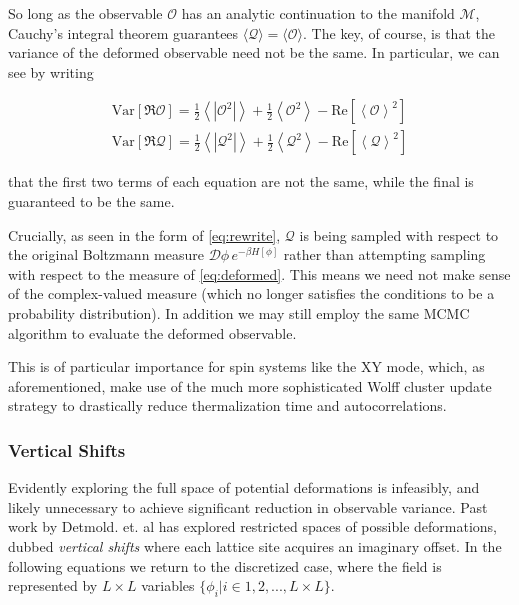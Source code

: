 \documentclass[12pt]{article}
\begin{document}
So long as the observable $\mathcal{O}$ has an analytic continuation to the manifold $\mathcal{M}$, Cauchy's integral theorem guarantees 
$\langle \mathcal{Q} \rangle = \langle \mathcal{O} \rangle$. The key, of course, is that the variance of the deformed observable need not be the
same. In particular, we can see by writing

\begin{equation} \label{eq:variances}
	\begin{split}
	\mathrm{Var}[\Re \mathcal{O}] = \frac{1}{2} \left\langle \left| \mathcal{O}^2 \right| \right\rangle + \frac{1}{2} \left\langle \mathcal{O}^2 \right\rangle 
	- \mathrm{Re}\left[ \left\langle \mathcal{O} \right\rangle^2 \right] \\ 
	\mathrm{Var}[\Re \mathcal{Q}] = \frac{1}{2} \left\langle \left| \mathcal{Q}^2 \right| \right\rangle + \frac{1}{2} \left\langle \mathcal{Q}^2 \right\rangle 
	- \mathrm{Re}\left[ \left\langle \mathcal{Q} \right\rangle^2 \right]
	\end{split}
\end{equation}

that the first two terms of each equation are not the same, while the final is guaranteed to be the same.

Crucially, as seen in the form of \ref{eq:rewrite}, $\mathcal{Q}$ is being sampled with respect to the original Boltzmann measure $\mathcal{D}\phi\, e^{-\beta H[\phi]}$
rather than attempting sampling with respect to the measure of \ref{eq:deformed}. This means we need not make sense of the complex-valued measure (which no
longer satisfies the conditions to be a probability distribution). In addition we may still employ the same MCMC algorithm to evaluate the deformed observable.

This is of particular importance for spin systems like the XY mode, which, as aforementioned, make use of the much more sophisticated Wolff 
cluster update strategy to drastically reduce thermalization time and autocorrelations.

\subsubsection{Vertical Shifts}

Evidently exploring the full space of potential deformations is infeasibly, and likely unnecessary to achieve significant reduction in observable
variance. Past work by Detmold. et. al \cite{Detmold_2021} has explored restricted spaces of possible deformations, dubbed \textit{vertical shifts} where 
each lattice site acquires an imaginary offset. In the following equations we return to the discretized case, where the field is represented
by $L\times L$ variables $\{\phi_i | i\in{1,2,...,L\times L}\}$.
\end{document}
